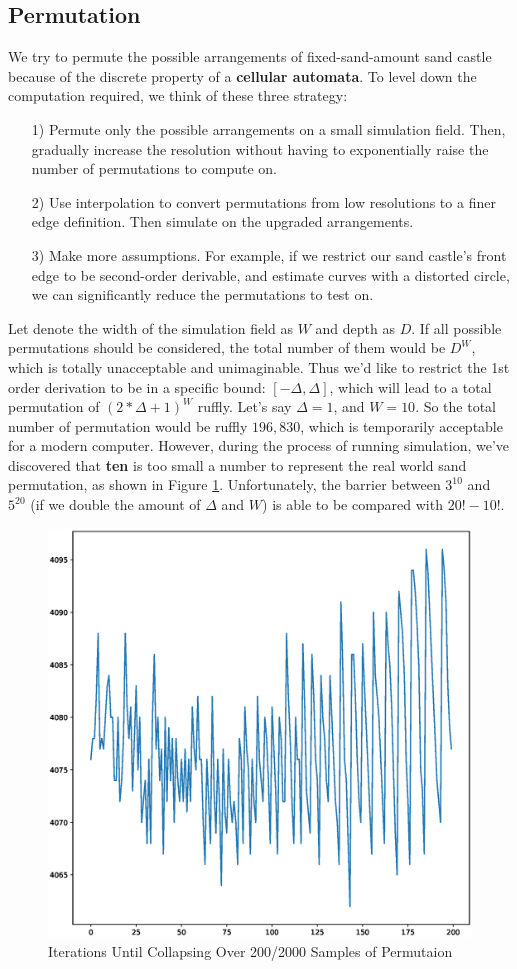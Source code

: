 \documentclass[12pt]{article}
\begin{document}
\subsection{Permutation}
We try to permute the possible arrangements of fixed-sand-amount sand castle because of the discrete property of a \textbf{cellular automata}. To level down the computation required, we think of these three strategy:
\begin{itemize}
    \item [1)]
          Permute only the possible arrangements on a small simulation field. Then, gradually increase the resolution without having to exponentially raise the number of permutations to compute on.
    \item [2)]
          Use interpolation to convert permutations from low resolutions to a finer edge definition. Then simulate on the upgraded arrangements.
    \item [3)]
          Make more assumptions. For example, if we restrict our sand castle's front edge to be second-order derivable, and estimate curves with a distorted circle, we can significantly reduce the permutations to test on.
\end{itemize}
Let denote the width of the simulation field as $W$ and depth as $D$. If all possible permutations should be considered, the total number of them would be $D^W$, which is totally unacceptable and unimaginable. Thus we'd like to restrict the 1st order derivation to be in a specific bound: $[-\varDelta,\varDelta]$, which will lead to a total permutation of $(2*\varDelta+1)^W$ ruffly. Let's say $\varDelta=1$, and $W=10$. So the total number of permutation would be ruffly $196,830$, which is temporarily acceptable for a modern computer. However, during the process of running simulation, we've discovered that \textbf{ten} is too small a number to represent the real world sand permutation, as shown in Figure \ref{fig:permutation}. Unfortunately, the barrier between $3^10$ and $5^20$ (if we double the amount of $\varDelta$ and $W$) is able to be compared with $20!-10!$.
\begin{figure}
    \centering
    \includegraphics[width=0.5\linewidth]{10x10.eps}
    \caption{Iterations Until Collapsing Over 200/2000 Samples of Permutaion}
    \label{fig:permutation}
\end{figure}
\end{document}
